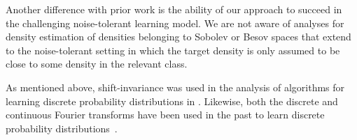 Another difference with prior work is the ability of our approach to succeed in the challenging noise-tolerant learning model.  We are not aware of analyses for density estimation of densities belonging to Sobolev or Besov spaces that extend to the noise-tolerant setting in which the target density is only assumed to be close to some density in the relevant class.

As mentioned above, shift-invariance was used in the analysis of algorithms for
learning discrete probability distributions in \citep{barbour1999poisson,daskalakis2013learning}.
Likewise, both the discrete and continuous Fourier transforms have been used in the past to learn discrete probability distributions~\citep{diakonikolas2016optimal,diakonikolas2016fourier, DDKT16}.

